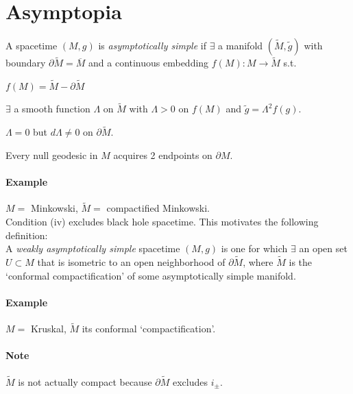 \section{Asymptopia}

A spacetime $(M,g)$ is \emph{asymptotically simple}
 if $\exists$ a manifold
$(\widetilde{M},\tilde{g})$ with boundary $\partial\widetilde{M}=\overline{M}$
and a continuous embedding $f(M):M\to\widetilde{M}$ s.t.
\begin{list}{()}
{}
\item $f(M)=\widetilde{M}-\partial \widetilde{M}$ 

\item $\exists$ a smooth function $\Lambda$ on $\widetilde{M}$ with 
$\Lambda >0$ on $f(M)$ and $\tilde{g}=\Lambda^2f(g)$.

\item $\Lambda=0$ but $d\Lambda\neq 0$ on $\partial\widetilde{M}$.

\item Every null geodesic in $M$ acquires 2 endpoints on $\partial M$.


\paragraph{Example} $M=$ Minkowski, $\widetilde{M}=$ compactified 
Minkowski.  \\

Condition (iv) excludes black hole spacetime.  This motivates the 
following definition: \\

A \emph{weakly asymptotically simple} 
spacetime $(M,g)$ is one for which $\exists$ an open set $U\subset M$ that is
isometric to an open neighborhood of $\partial\widetilde{M}$, where
$\widetilde{M}$ is the `conformal compactification' of some asymptotically
simple manifold. 

\paragraph{Example}  $M=$ Kruskal, $\widetilde{M}$ its conformal 
`compactification'. 

\paragraph{Note}
\begin{list}{()}
{}
\item $\widetilde{M}$ is not actually compact because 
$\partial\widetilde{M}$ excludes $i_{\pm}$.  


\end{list}
\end{list}
